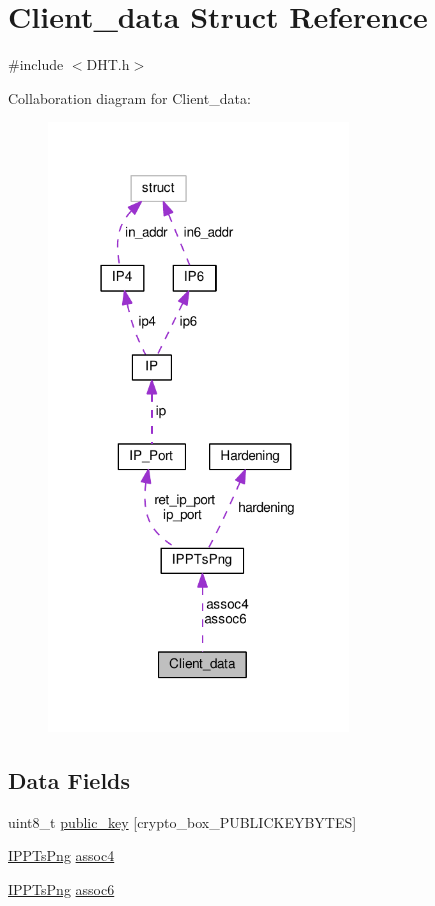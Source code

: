 \hypertarget{struct_client__data}{\section{Client\+\_\+data Struct Reference}
\label{struct_client__data}
}


{\ttfamily \#include $<$D\+H\+T.\+h$>$}



Collaboration diagram for Client\+\_\+data\+:
\nopagebreak
\begin{figure}[H]
\begin{center}
\leavevmode
\includegraphics[width=226pt]{df/da2/struct_client__data__coll__graph}
\end{center}
\end{figure}
\subsection*{Data Fields}
\begin{DoxyCompactItemize}
\item 
uint8\+\_\+t \hyperlink{struct_client__data_aaa806bb1136fb3d4b5d8d8970b596ff7}{public\+\_\+key} \mbox{[}crypto\+\_\+box\+\_\+\+P\+U\+B\+L\+I\+C\+K\+E\+Y\+B\+Y\+T\+E\+S\mbox{]}
\item 
\hyperlink{struct_i_p_p_ts_png}{I\+P\+P\+Ts\+Png} \hyperlink{struct_client__data_ac9843379cbcd02bdfa5c180a1474a6c5}{assoc4}
\item 
\hyperlink{struct_i_p_p_ts_png}{I\+P\+P\+Ts\+Png} \hyperlink{struct_client__data_a87d394929a2604f6f785fec949fac618}{assoc6}
\end{DoxyCompactItemize}


